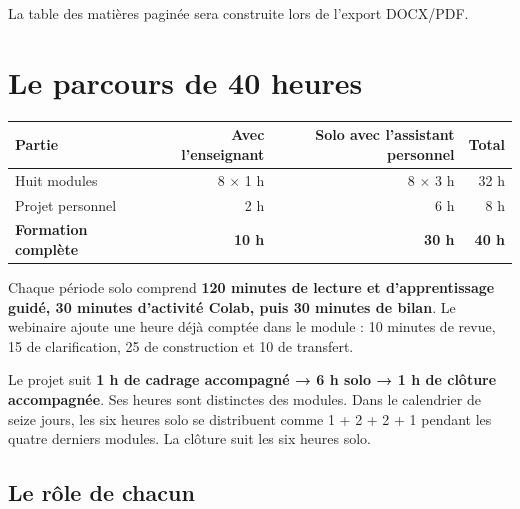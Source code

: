 \documentclass[
  canadien,
  11pt,
  a4paper,
]{report}
\newcounter{none} %
\begin{document}
La table des matières paginée sera construite lors de l'export DOCX/PDF.

\chapter{Le parcours de 40 heures}\label{le-parcours-de-40-heures}

{\def\LTcaptype{none} %
\begin{longtable}[]{@{}lrrr@{}}
\toprule\noalign{}
Partie & Avec l'enseignant & Solo avec l'assistant personnel & Total \\
\midrule\noalign{}
\endhead
\bottomrule\noalign{}
\endlastfoot
Huit modules & 8 × 1 h & 8 × 3 h & 32 h \\
Projet personnel & 2 h & 6 h & 8 h \\
\textbf{Formation complète} & \textbf{10 h} & \textbf{30 h} & \textbf{40
h} \\
\end{longtable}
}

Chaque période solo comprend \textbf{120 minutes de lecture et
d'apprentissage guidé, 30 minutes d'activité Colab, puis 30 minutes de
bilan}. Le webinaire ajoute une heure déjà comptée dans le module : 10
minutes de revue, 15 de clarification, 25 de construction et 10 de
transfert.

Le projet suit \textbf{1 h de cadrage accompagné → 6 h solo → 1 h de
clôture accompagnée}. Ses heures sont distinctes des modules. Dans le
calendrier de seize jours, les six heures solo se distribuent comme 1 +
2 + 2 + 1 pendant les quatre derniers modules. La clôture suit les six
heures solo.

\section{Le rôle de chacun}\label{le-ruxf4le-de-chacun}
\end{document}
